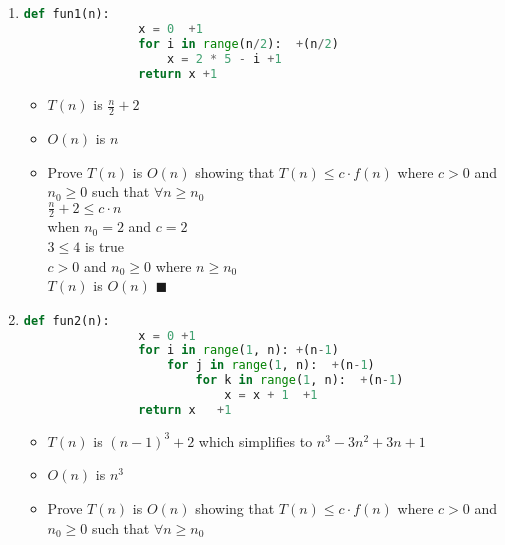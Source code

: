 \documentclass[11pt]{article}
\begin{document}
      \begin{enumerate}[label=(\arabic*)]
      \item \begin{lstlisting}[language=Python]
            def fun1(n):
                x = 0  +1
                for i in range(n/2):  +(n/2)
                    x = 2 * 5 - i +1
                return x +1
            \end{lstlisting}

 
\begin{itemize}
\item $T(n)$ is $\frac{n}{2} + 2$
\item $O(n)$ is $n$
\item Prove $T(n)$ is $O(n)$ showing that $T(n) \leq c \cdot f(n)$ where $c > 0$ and $n_{0} \geq 0$ such that $ \forall  n \geq n_{0}$ \\ 
 
\centering $\frac{n}{2} +2 \leq c \cdot n$  \\
\vspace{5pt}
when $n_{0} = 2$ and $c = 2$ \\
\vspace{5pt}
\centering $ 3 \leq 4$ is true\\
\vspace{5pt}
 $c > 0$ and $ n_{0} \geq 0 $ where $  n \geq n_{0}$  \\
\vspace{5pt}
 $T(n)$ is $O(n)$  $\blacksquare$
							
\end{itemize}

      \item \begin{lstlisting}[language=Python]
            def fun2(n):
                x = 0 +1
                for i in range(1, n): +(n-1)
                    for j in range(1, n):  +(n-1)
                        for k in range(1, n):  +(n-1)
                            x = x + 1  +1
                return x   +1
            \end{lstlisting}

\begin{itemize}
\item $T(n)$ is $(n-1)^3 +2$ which simplifies to $n^3-3n^2+3n+1$
\item $O(n)$ is $n^3$

\item Prove $T(n)$ is $O(n)$ showing that $T(n) \leq c \cdot f(n)$ where $c > 0$ and $n_{0} \geq 0$ such that $ \forall  n \geq n_{0}$ \\ 


\end{itemize}
\end{enumerate}
\end{document}

